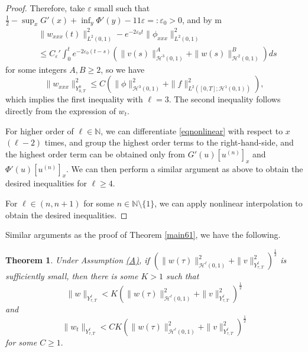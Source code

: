 \documentclass[10pt,a4paper,final]{article}
\numberwithin{equation}{section}
\newtheorem{theorem}{Theorem}[section]
\newcommand{\N}{\mathbb{N}}
\newcommand{\cH}{\mathcal{H}}
\newcommand{\Ge}{\varepsilon}
\begin{document}
\begin{proof}
Therefore, take $\Ge$ small such that $\frac12-\sup_{x}G'(x)+\inf_{y}\Phi'(y)-11\Ge=:\Ge_0>0$, and by m 
    \begin{align*}
        &\|w_{xxx}(t)\|^2_{L^2(0,1)}-e^{-2\Ge_0t}\|\phi_{xxx}\|_{L^2(0,1)}^2\\
        &\leq C_{\Ge}'\int_0^te^{-2\Ge_0(t-s)}(\|v(s)\|_{\cH^3(0,1)}^{A}+\|w(s)\|_{\cH^2(0,1)}^B)ds
    \end{align*}
for some integers $A,B\geq 2$, 
so we have 
$$\|w_{xxx}\|_{Y^{0}_{0,T}}^2\leq C( \|\phi\|_{\cH^3(0,1)}^2+\|f\|_{L^2([0,T];\cH^1(0,1))}^2),$$
which implies the first inequality with $\ell=3$. The second inequality follows directly from the expression of $w_t$. 

For higher order of $\ell\in \N$, we can differentiate \eqref{eqnonlinear} with respect to $x$ $(\ell-2)$ times, and group the highest order terms to the right-hand-side, and the highest order term can be obtained only from $G'(u)[u^{(n)}]_x$ and $\Phi'(u)[u^{(n)}]_x$. We can then perform a similar argument as above to obtain the desired inequalities for $\ell\geq 4$.

For $\ell\in (n,n+1)$ for some $n\in \N\setminus\{1\}$, we can  apply nonlinear interpolation to obtain the desired inequalities.

\end{proof}

Similar arguments as the proof of Theorem \ref{main61}, we have the following.
\begin{theorem}\label{thm62}
Under Assumption \hyperlink{(A)}{(A)}, if $(\|w(\tau)\|_{\cH^\ell(0,1)}^2+\|v\|_{Y^{\ell}_{\tau,T}}^2)^{\frac12}$ is sufficiently small, then there is some $K>1$ such that 
    $$\|w\|_{Y^{\ell}_{\tau,T}}<K(\|w(\tau)\|_{\cH^\ell(0,1)}^2+\|v\|_{Y^{\ell}_{\tau,T}}^2)^{\frac12}$$
    and 
    $$\|w_t\|_{Y^{\ell}_{\tau,T}}<CK(\|w(\tau)\|_{\cH^\ell(0,1)}^2+\|v\|_{Y^{\ell}_{\tau,T}}^2)^{\frac12}$$
    for some $C\geq 1.$
\end{theorem}
\end{document}
